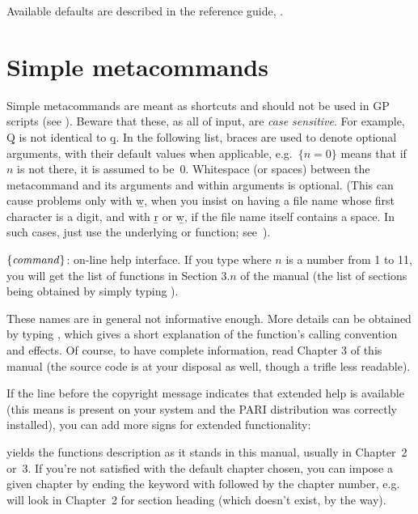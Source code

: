 Available defaults are described in the reference guide,
.

\section{Simple metacommands}\label{se:meta}

\noindent
Simple metacommands are meant as shortcuts and should not be used in GP
scripts (see ). Beware that these, as all of  input,
are \emph{case sensitive}. For example, \b{Q} is not identical to \b{q}. In
the following list, braces are used to denote optional arguments, with their
default values when applicable, e.g.~$\{n=0\}$ means that if $n$ is not
there, it is assumed to be~$0$. Whitespace (or spaces) between the
metacommand and its arguments and within arguments is optional. (This can
cause problems only with \b{w}, when you insist on having a file name whose
first character is a digit, and with \b{r} or \b{w}, if the file name itself
contains a space. In such cases, just use the underlying  or
 function; see~).

 $\{\hbox{\it command\/}\}$:  on-line help interface.
If you type  where $n$ is a number from 1 to 11, you will get the
list of functions in Section $3.n$ of the manual (the list of sections being
obtained by simply typing ). \label{se:exthelp}

These names are in general not informative enough. More details can be
obtained by typing , which gives a short explanation of
the function's calling convention and effects. Of course, to have complete
information, read Chapter 3 of this manual (the source code is at your
disposal as well, though a trifle less readable).

If the line before the copyright message indicates that extended help is
available (this means  is present on your system and the PARI
distribution was correctly installed), you can add more  signs for
extended functionality:

 yields the functions description as it stands in this
manual, usually in Chapter~2 or~3. If you're not satisfied with the default
chapter chosen, you can impose a given chapter by ending the keyword with
 followed by the chapter number, e.g.~ will look in
Chapter~2 for section heading  (which doesn't exist, by the way).

